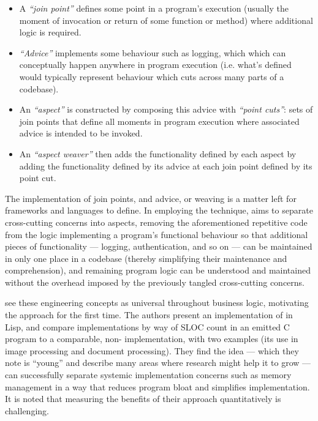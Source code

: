 \begin{itemize}
    \item A \emph{``join point''} defines some point in a program's execution
    (usually the moment of invocation or return of some function or method)
    where additional logic is required.
    \item \emph{``Advice''} implements some behaviour such as logging, which
    which can conceptually happen anywhere in program execution (i.e. what's
    defined would typically represent behaviour which cuts across many parts of
    a codebase).
    \item An \emph{``aspect''} is constructed by composing this advice with
    \emph{``point cuts''}: sets of join points that define all moments in
    program execution where associated advice is intended to be invoked.
    \item An \emph{``aspect weaver''} then adds the functionality defined by
    each aspect by adding the functionality defined by its advice at each join
    point defined by its point cut.
\end{itemize}

The implementation of join points, and advice, or weaving is a matter left for
\aspectorientation{} frameworks and \aspectoriented{} languages to define. In
employing the technique, \aop{} aims to separate cross-cutting concerns into
aspects, removing the aforementioned repetitive code from the logic implementing
a program's functional behaviour so that additional pieces of functionality ---
logging, authentication, and so on --- can be maintained in only one place in a
codebase (thereby simplifying their maintenance and comprehension), and
remaining program logic can be understood and maintained without the overhead
imposed by the previously tangled cross-cutting concerns.

\citet{kiczales1997aspect} see these engineering concepts as universal
throughout business logic, motivating the \aspectoriented{} approach for the
first time. The authors present an implementation of \aop{} in Lisp, and compare
implementations by way of SLOC count in an emitted C program to a comparable,
non-\aspectoriented{} implementation, with two examples (its use in image
processing and document processing). They find the idea --- which they note is
``young'' and describe many areas where research might help it to grow --- can
successfully separate systemic implementation concerns such as memory management
in a way that reduces program bloat and simplifies implementation. It is noted
that measuring the benefits of their approach quantitatively is challenging.

